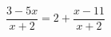 \begin{ex}
	\begin{condition}
		\( \dfrac{3-5x}{x+2}=2+\dfrac{x-11}{x+2} \)
	\end{condition}
\end{ex}